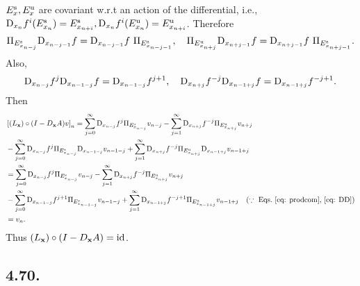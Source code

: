 \documentclass[a4paper,11pt,fleqn]{article}
\begin{document}
$E^{\rm s}_x, E^{\rm u}_x$ are covariant w.r.t an action of the differential, i.e., ${\rm D}_{x_{n}}f^i(E^{\rm s}_{x_{n}})=E^{\rm s}_{x_{n+i}}, {\rm D}_{x_{n}}f^i(E^{\rm u}_{x_{n}})=E^{\rm u}_{x_{n+i}}$. Therefore 
\begin{equation}
    \Pi_{E_{x_{n-j}}^{\mathrm{s}}}{\rm D}_{x_{n-j-1}}f = {\rm D}_{x_{n-j-1}}f \ \Pi_{E_{x_{n-j-1}}^{\mathrm{s}}}, \quad \Pi_{E_{x_{n+j}}^{\mathrm{u}}}{\rm D}_{x_{n+j-1}}f = {\rm D}_{x_{n+j-1}}f \ \Pi_{E_{x_{n+j-1}}^{\mathrm{s}}}. \label{eq: prodcom}
\end{equation}
Also, 
\begin{equation}
    {\rm D}_{x_{n-j}}f^j{\rm D}_{x_{n-1-j}}f = {\rm D}_{x_{n-1-j}}f^{j+1}, \quad {\rm D}_{x_{n+j}}f^{-j}{\rm D}_{x_{n-1+j}}f = {\rm D}_{x_{n-1+j}}f^{-j+1}. \label{eq: DD}
\end{equation}
Then
\begin{align}
    &\left[(L_{\bf x})\circ (I-D_{\bf x}A)v \right]_n = 
    \sum_{j=0}^{\infty} \mathrm{D}_{x_{n-j}} f^j \Pi_{E_{x_{n-j}}^{\mathrm{s}}} v_{n-j}-\sum_{j=1}^{\infty} \mathrm{D}_{x_{n+j}} f^{-j} \Pi_{E_{x_{n+j}}^{\mathrm{u}}} v_{n+j} \nonumber \\
    &-  \sum_{j=0}^{\infty} \mathrm{D}_{x_{n-j}} f^j \Pi_{E_{x_{n-j}}^{\mathrm{s}}} {\rm D}_{x_{n-1-j}} v_{n-1-j} + \sum_{j=1}^{\infty} \mathrm{D}_{x_{n+j}} f^{-j} \Pi_{E_{x_{n+j}}^{\mathrm{u}}} {\rm D}_{x_{n-1+j}} v_{n-1+j}  \nonumber \\
    &=\sum_{j=0}^{\infty} \mathrm{D}_{x_{n-j}} f^j \Pi_{E_{x_{n-j}}^{\mathrm{s}}} v_{n-j}-\sum_{j=1}^{\infty} \mathrm{D}_{x_{n+j}} f^{-j} \Pi_{E_{x_{n+j}}^{\mathrm{u}}} v_{n+j} \nonumber \\
    &-\sum_{j=0}^{\infty} \mathrm{D}_{x_{n-1-j}} f^{j+1} \Pi_{E_{x_{n-1-j}}^{\mathrm{s}}} v_{n-1-j}+\sum_{j=1}^{\infty} \mathrm{D}_{x_{n-1+j}} f^{-j+1} \Pi_{E_{x_{n-1+j}}^{\mathrm{u}}} v_{n-1+j} \quad (\because \text{ Eqs.~\ref{eq: prodcom},~\ref{eq: DD}}) \nonumber \\
    &=v_n. 
\end{align}
Thus $(L_{\bf x})\circ(I-D_{\bf x}A) = {\rm id}$. 
\hruleskip

\subsection{4.70.}
\end{document}
